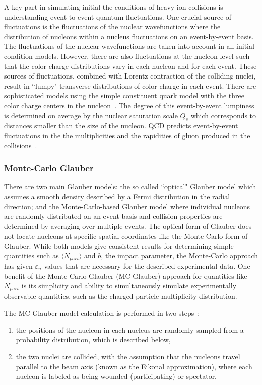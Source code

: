 A key part in simulating initial the conditions of heavy ion collisions is understanding event-to-event quantum fluctuations. One crucial source of fluctuations is the fluctuations of the nuclear wavefunctions where the distribution of nucleons within a nucleus fluctuations on an event-by-event basis. The fluctuations of the nuclear wavefunctions are taken into account in all initial condition models. However, there are also fluctuations at the nucleon level such that the color charge distributions vary in each nucleon and for each event. These sources of fluctuations, combined with Lorentz contraction of the colliding nuclei, result in ``lumpy" transverse distributions of color charge in each event. There are sophisticated models using the simple constituent quark model with the three color charge centers in the nucleon~\cite{PhysRevC.94.024919}. The degree of this event-by-event lumpiness is determined on average by the nuclear saturation scale $Q_s$ which corresponds to distances smaller than the size of the nucleon. QCD predicts event-by-event fluctuations in the the multiplicities and the rapidities of gluon produced in the collisions~\cite{PhysRevLett.108.252301}.

\subsubsection{Monte-Carlo Glauber}%
\label{sec:ch2_mc_glaub}
There are two main Glauber models: the so called ``optical" Glauber model which assumes a smooth density described by a Fermi distribution in the radial direction; and the Monte-Carlo-based Glauber model where individual nucleons are randomly distributed on an event basis and collision properties are determined by averaging over multiple events. The optical form of Glauber does not locate nucleons at specific spatial coordinates like the Monte Carlo form of Glauber. While both models give consistent results for determining simple quantities such as $\langle N_{part}\rangle$ and $b$, the impact parameter, the Monte-Carlo approach has given $\varepsilon_n$ values that are necessary for the described experimental data. One benefit of the Monte-Carlo Glauber (MC-Glauber) approach for quantities like $N_{part}$ is its simplicity and ability to simultaneously simulate experimentally observable quantities, such as the charged particle multiplicity distribution.

The MC-Glauber model calculation is performed in two steps~\cite{Alver:2008aq}:
\begin{enumerate}
\item the positions of the nucleon in each nucleus are randomly sampled from a probability distribution, which is described below, 
\item the two nuclei are collided, with the assumption that the nucleons travel parallel to the beam axis (known as the Eikonal approximation), where each nucleon is labeled as being wounded (participating) or spectator.
\end{enumerate}

